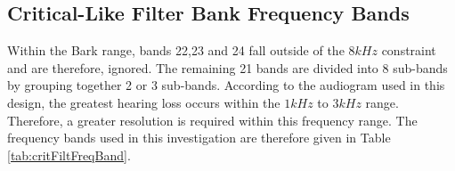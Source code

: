 \documentclass[12pt, onecolumn]{article}
\begin{document}
\begin{appendices}
\section{Critical-Like Filter Bank Frequency Bands}

\label{app:critFiltFreqBand}

\noindent Within the Bark range, bands 22,23 and 24 fall outside of the $8kHz$ constraint and are therefore, ignored. The remaining 21 bands are divided into 8 sub-bands by grouping together 2 or 3 sub-bands. According to the audiogram used in this design, the greatest hearing loss occurs within the $1kHz$ to $3kHz$ range. Therefore, a greater resolution is required within this frequency range. The frequency bands used in this investigation are therefore given in Table \ref{tab:critFiltFreqBand}.


\end{appendices}
\end{document}
